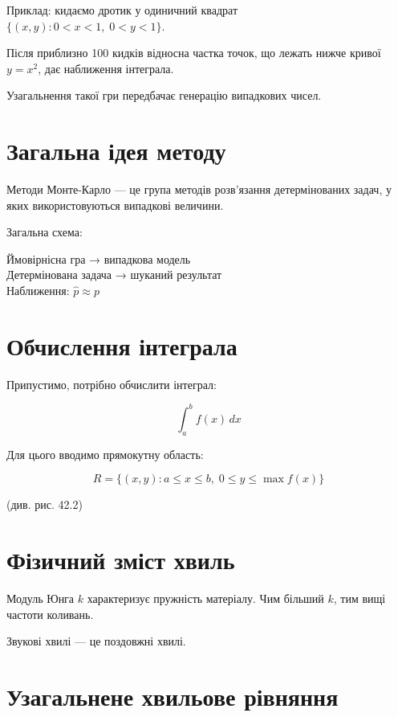 Приклад: кидаємо дротик у одиничний квадрат\\
\(\{(x, y): 0 < x < 1,\; 0 < y < 1\}\).

Після приблизно 100 кидків відносна частка точок, що лежать нижче кривої \(y = x^2\), дає наближення інтеграла.

Узагальнення такої гри передбачає генерацію випадкових чисел.

\section{Загальна ідея методу}\label{ux437ux430ux433ux430ux43bux44cux43dux430-ux456ux434ux435ux44f-ux43cux435ux442ux43eux434ux443}

Методи Монте-Карло --- це група методів розв'язання детермінованих задач, у яких використовуються випадкові величини.

Загальна схема:

Ймовірнісна гра → випадкова модель\\
Детермінована задача → шуканий результат\\
Наближення: \(\hat{p} \approx p\)

\section{Обчислення інтеграла}\label{ux43eux431ux447ux438ux441ux43bux435ux43dux43dux44f-ux456ux43dux442ux435ux433ux440ux430ux43bux430}

Припустимо, потрібно обчислити інтеграл:

\[
\int_a^b f(x)\,dx
\]

Для цього вводимо прямокутну область:

\[
R = \{(x,y): a \le x \le b,\; 0 \le y \le \max f(x)\}
\]

(див. рис. 42.2)

\section{Фізичний зміст хвиль}\label{ux444ux456ux437ux438ux447ux43dux438ux439-ux437ux43cux456ux441ux442-ux445ux432ux438ux43bux44c}

Модуль Юнга \(k\) характеризує пружність матеріалу. Чим більший \(k\), тим вищі частоти коливань.

Звукові хвилі --- це поздовжні хвилі.

\section{Узагальнене хвильове рівняння}\label{ux443ux437ux430ux433ux430ux43bux44cux43dux435ux43dux435-ux445ux432ux438ux43bux44cux43eux432ux435-ux440ux456ux432ux43dux44fux43dux43dux44f}

